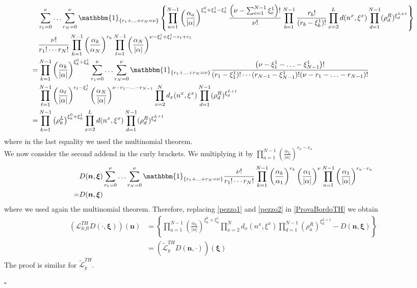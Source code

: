 \documentclass[10pt]{article}
\numberwithin{equation}{section}
\numberwithin{equation}{subsection}
\begin{document}
\begin{align}\label{pezzo1}
	&\sum_{r_{1}=0}^{\nu}\ldots\sum_{r_{N}=0}^{\nu}\mathbbm{1}_{\{r_{1}+\ldots+r_{N}=\nu\}}\left\{\prod_{a=1}^{N-1}\left(\frac{\alpha_{a}}{|\alpha|}\right)^{\xi_{a}^{0}+\xi_{k}^{1}-\xi_{k}^{1}}\frac{\left(\nu-\sum_{c=1}^{N-1}\xi_{c}^{1}\right)!}{\nu!}\prod_{b=1}^{N-1}\frac{r_{b}!}{(r_{b}-\xi^{1}_{b})!}\prod_{x=2}^{L}d(n^{x},\xi^{x})\prod_{d=1}^{N-1}(\rho_{d}^{R})^{\xi_{d}^{L+1}}\right\}\nonumber\\&	\frac{\nu!}{r_{1}!\cdots r_{N}!}\prod_{k=1}^{N-1}\left(\frac{\alpha_{k}}{\alpha_{N}}\right)^{r_{k}}\prod_{\ell=1}^{N-1}\left(\frac{\alpha_{N}}{|\alpha|}\right)^{\nu-\xi_{\ell}^{1}+\xi_{\ell}^{1}-r_{\ell}+r_{\ell}}\nonumber\\=&
	\prod_{k=1}^{N-1}\left(\frac{\alpha_{k}}{|\alpha|}\right)^{\xi_{k}^{0}+\xi_{k}^{1}}\sum_{r_{1}=0}^{\nu}\ldots\sum_{r_{N}=0}^{\nu}\mathbbm{1}_{\{r_{1}+\ldots+r_{N}=\nu\}}	\frac{\left(\nu-\xi_{1}^{1}-\ldots-\xi_{N-1}^{1}\right)!}{(r_{1}-\xi_{1}^{1})!\cdots(r_{N-1}-\xi_{N-1}^{1})!(\nu-r_{1}-\ldots-r_{N-1})!}\nonumber\\&
	\prod_{\ell=1}^{N-1}\left(\frac{\alpha_{\ell}}{|\alpha|}\right)^{r_{\ell}-\xi_{\ell}^{1}}\left(\frac{\alpha_{N}}{|\alpha|}\right)^{\nu-r_{1}-\ldots-r_{N-1}}\prod_{x=2}^{N}d_{x}(n^{x},\xi^{x})\prod_{d=1}^{N-1}(\rho_{d}^{R})^{\xi_{d}^{L+1}}\nonumber
	\\=&
	\prod_{k=1}^{N-1}\left(\rho_{k}^{L}\right)^{\xi_{k}^{0}+\xi_{k}^{1}}\prod_{x=2}^{L}d(n^{x},\xi^{x})\prod_{d=1}^{N-1}(\rho_{d}^{R})^{\xi_{d}^{L+1}}
\end{align}
where in the last equality we used the multinomial theorem. \\ We now consider the second addend in the curly brackets.
We multiplying it by $\prod_{a=1}^{N-1}\left(\frac{\alpha_{1}}{|\alpha|}\right)^{r_{a}-r_{a}}$ 
\begin{equation}\label{pezzo2}
	\begin{split}
	&D(\bm{n},\bm{\xi})\sum_{r_{1}=0}^{\nu}\ldots\sum_{r_{N}=0}^{\nu}\mathbbm{1}_{\{r_{1}+\ldots+r_{N}=\nu\}}\frac{\nu!}{r_{1}!\cdots r_{N}!}\prod_{k=1}^{N-1}\left(\frac{\alpha_{k}}{\alpha_{1}}\right)^{r_{k}}\left(\frac{\alpha_{1}}{|\alpha|}\right)^{\nu}\prod_{a=1}^{N-1}\left(\frac{\alpha_{1}}{|\alpha|}\right)^{r_{a}-r_{a}}\\=&D(\bm{n},\bm{\xi})
	\end{split}
\end{equation}
where we used again the multinomial theorem. Therefore, replacing \eqref{pezzo1} and \eqref{pezzo2} in \eqref{ProvaBordoTH} we obtain 
\begin{align}
	\left(\mathcal{L}_{left}^{TH}D(\cdot,\bm{\xi})\right)(\bm{n})&=\left\{\prod_{a=1}^{N-1}\left(\frac{\alpha_{k}}{|\alpha|}\right)^{\xi_{a}^{0}+\xi_{a}^{1}}\prod_{x=2}^{N}d_{x}(n^{x},\xi^{x})\prod_{d=1}^{N-1}(\rho_{a}^{R})^{\xi_{d}^{L+1}}-D(\bm{n},\bm{\xi})\right\}
	\\&=
	\left(\widetilde{\mathcal{L}}_{y}^{TH}D(\bm{n},\cdot)\right)(\bm{\xi})
\end{align}
The proof is similar for $\widetilde{\mathcal{L}}_{y}^{TH}$. 
\begin{flushright}
	$\square$
\end{flushright}
\end{document}

